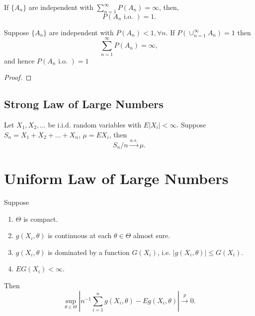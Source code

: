 \begin{lemma}
	If $\{A_n\}$ are independent with $\sum_{n=1}^{\infty}P\left(A_{n}\right)=\infty$, then,
	\begin{equation}
		P\left(A_{n}\text{ i.o. }\right)=1.
	\end{equation}
\end{lemma}

\begin{corollary}
	Suppose $\{A_{n}\}$ are independent with $P\left(A_{n}\right)<1,\forall n$. If $P\left(\cup_{n=1}^{\infty}A_{n}\right)=1$ then
	\begin{equation}
		\sum_{n=1}^{\infty}P\left(A_{n}\right)=\infty,
	\end{equation}
	and hence $P\left(A_{n}\text{ i.o. }\right)=1$
\end{corollary}

\begin{proof}

\end{proof}

\subsection{Strong Law of Large Numbers}

\begin{theorem} \label{thm:SLLN}
	Let $X_1,X_2,\ldots$ be i.i.d. random variables with $E|X_i|<\infty$. Suppose $S_n=X_1+X_2+\ldots+X_n$, $\mu=EX_i$, then
	\begin{equation}
		S_n/n\stackrel{a.s.}{\rightarrow}\mu.
	\end{equation}
\end{theorem}

\section{Uniform Law of Large Numbers}

\begin{theorem} \label{thm:ULLN}
	Suppose
	\begin{enumerate}
		\item $\Theta$ is compact.
		\item $g\left(X_{i},\theta\right)$ is continuous at each $\theta\in\Theta$ almost sure.
		\item $g\left(X_{i},\theta\right)$ is dominated by a function $G\left(X_{i}\right)$, i.e. $\left|g\left(X_{i},\theta\right)\right|\leq G\left(X_{i}\right)$.
		\item $EG\left(X_{i}\right)<\infty$.
	\end{enumerate}
	Then
	\begin{equation}
		\sup_{\theta\in\Theta}\left|n^{-1}\sum_{i=1}^{n}g\left(X_{i},\theta\right)-Eg\left(X_{i},\theta\right)\right|\stackrel{p}{\rightarrow}0.
	\end{equation}
\end{theorem}

